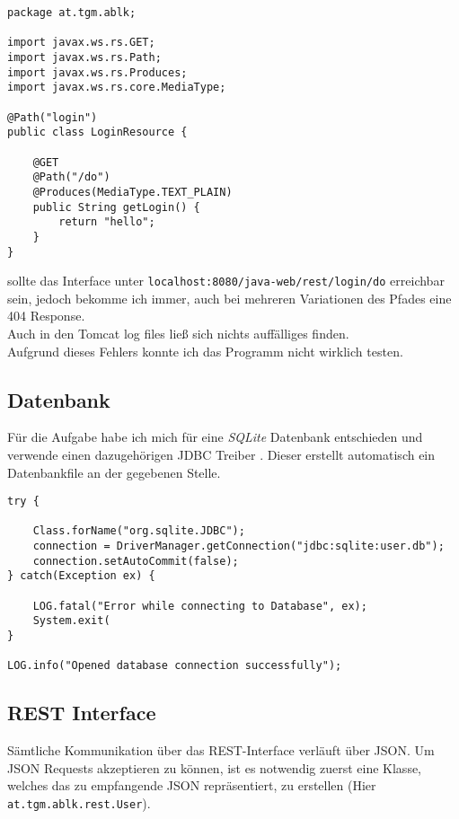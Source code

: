 \begin{lstlisting}[style=Java, caption=Java Testfile]
package at.tgm.ablk;

import javax.ws.rs.GET;
import javax.ws.rs.Path;
import javax.ws.rs.Produces;
import javax.ws.rs.core.MediaType;

@Path("login")
public class LoginResource {

    @GET
    @Path("/do")
    @Produces(MediaType.TEXT_PLAIN)
    public String getLogin() {
        return "hello";
    }
}
\end{lstlisting}

sollte das Interface unter \texttt{localhost:8080/java-web/rest/login/do} erreichbar sein, jedoch bekomme ich immer, auch bei mehreren Variationen des Pfades eine 404 Response.\\
Auch in den Tomcat log files ließ sich nichts auffälliges finden.\\
Aufgrund dieses Fehlers konnte ich das Programm nicht wirklich testen.

\subsection{Datenbank}

Für die Aufgabe habe ich mich für eine \textit{SQLite} Datenbank entschieden und verwende einen dazugehörigen JDBC Treiber \cite{sqlite-jdbc}. Dieser erstellt automatisch ein Datenbankfile an der gegebenen Stelle.

\begin{lstlisting}[style=Java, caption=Aufbau der SQLite Datenbenkverbindung]
try {

	Class.forName("org.sqlite.JDBC");
    connection = DriverManager.getConnection("jdbc:sqlite:user.db");
    connection.setAutoCommit(false);
} catch(Exception ex) {

	LOG.fatal("Error while connecting to Database", ex);
   	System.exit(
}

LOG.info("Opened database connection successfully");
\end{lstlisting}

\subsection{REST Interface}

Sämtliche Kommunikation über das REST-Interface verläuft über JSON. Um JSON Requests akzeptieren zu können, ist es notwendig zuerst eine Klasse, welches das zu empfangende JSON repräsentiert, zu erstellen (Hier \texttt{at.tgm.ablk.rest.User}).

